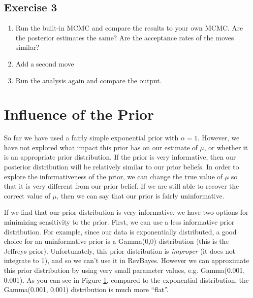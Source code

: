\subsection{Exercise 3}

\begin{enumerate}[label=\textnormal{Step \arabic*)}]
	\item Run the built-in MCMC and compare the results to your own MCMC. Are the posterior estimates the same? Are the acceptance rates of the moves similar?
	\item Add a second move 
	\item Run the analysis again and compare the output.
\end{enumerate}

\section{Influence of the Prior}

So far we have used a fairly simple exponential prior with $\alpha = 1$.
However, we have not explored what impact this prior has on our estimate of $\mu$, or whether it is an appropriate prior distribution.
If the prior is very informative, then our posterior distribution will be relatively similar to our prior beliefs.
In order to explore the informativeness of the prior, we can change the true value of $\mu$ so that it is very different from our prior belief.
If we are still able to recover the correct value of $\mu$, then we can say that our prior is fairly uninformative.

If we find that our prior distribution is very informative, we have two options for minimizing sensitivity to the prior.
First, we can use a less informative prior distribution.
For example, since our data is exponentially distributed, a good choice for an uninformative prior is a Gamma(0,0) distribution (this is the Jeffreys prior).
Unfortunately, this prior distribution is \emph{improper} (it does not integrate to 1), and so we can't use it in RevBayes.
However we can approximate this prior distribution by using very small parameter values, e.g. Gamma(0.001, 0.001).
As you can see in Figure \ref{fig:gamma_distribution}, compared to the exponential distribution, the Gamma(0.001, 0.001) distribution is much more ``flat''.

\begin{figure}[h!]
\centering
{}
\label{fig:gamma_distribution}
\end{figure}

